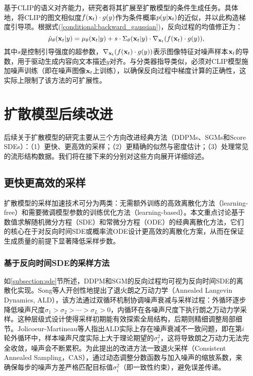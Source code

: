\documentclass[11pt,a4paper,UTF8]{ctexart}
\begin{document}
基于CLIP的语义对齐能力，研究者将其扩展至扩散模型的条件生成任务\cite{clip-guide-1,Patashnik_2021_ICCV,gal2022StyleGAN}。具体地，将CLIP的图文相似度$f(\mathbf{x}_t)\cdot g(y)$作为条件概率$p(y|\mathbf{x}_t)$的近似，并以此构造梯度引导项。根据式(\ref{conditional:backward_gaussian})，反向过程的均值修正为：
\begin{equation}
\hat{\mu}_{\theta}(\mathbf{x}_t|y)=\mu_{\theta}(\mathbf{x}_t|y) + s\cdot\Sigma_\theta(\mathbf{x}_t|y)\cdot\nabla_{\mathbf{x}_t}(f(\mathbf{x}_t)\cdot g(y)),
\label{conditional_clip_guided}
\end{equation}
其中$s$是控制引导强度的超参数，$\nabla_{\mathbf{x}_t}(f(\mathbf{x}_t)\cdot g(y))$表示图像特征对噪声样本$\mathbf{x}_t$的导数，用于驱动生成内容向文本描述$y$对齐。与分类器指导类似，必须对CLIP模型施加噪声训练（即在噪声图像$\mathbf{x}_t$上训练），以确保反向过程中梯度计算的正确性，这实际上限制了该方法的可扩展性。


\section{扩散模型后续改进}

后续关于扩散模型的研究主要从三个方向改进经典方法（DDPMs、SGMs和Score SDEs）：（1）更快、更高效的采样；（2）更精确的似然与密度估计；（3）处理常见的流形结构数据。我们将在接下来的分别对这些方向展开详细综述。

\subsection{更快更高效的采样}

扩散模型的采样加速技术可分为两类：无需额外训练的高效离散化方法（learning-free）和需要微调模型参数的训练优化方法（learning-based）。本文重点讨论基于数值求解随机微分方程（SDE）和常微分方程（ODE）的经典离散化方法，它们的核心在于对反向时间SDE或概率流ODE设计更高效的离散化方案，从而在保证生成质量的前提下显著降低采样步数。

\subsubsection{基于反向时间SDE的采样方法}

如\ref{subsection:sde}节所述，DDPM和SGM的反向过程均可视为反向时间SDE的离散化实现。Song等人\cite{song2019generative}开创性地提出了退火朗之万动力学（Annealed Langevin Dynamics, ALD），该方法通过双循环机制协调噪声衰减与采样过程：外循环逐步降低噪声尺度$\sigma_1>\sigma_2>\cdots>\sigma_L>0$，内循环在各噪声尺度下执行朗之万动力学采样。这种层级式设计使得采样初期能有效探索全局结构，后期则精细调整局部细节。Jolicoeur-Martineau等人\cite{JolicoeurMartineau2021AdversarialSM}指出ALD实际上存在噪声衰减不一致问题，即在第$i$轮外循环中，样本噪声尺度实际上大于理论期望的$\sigma_i^2$，这将导致朗之万动力无法完全收敛，噪声会不断累积。为此提出的改进方法一致退火采样（Consistent Annealed Sampling，CAS），通过动态调整分数函数与加入噪声的缩放系数，来确保每步的噪声方差严格匹配目标值$\sigma_i^2$（即一致性约束），避免误差传递。
\end{document}
